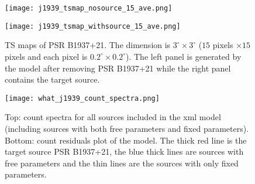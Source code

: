 \documentclass[a4paper, 12pt]{report}
\newcommand{\add}[1]{
  $<$\colorbox{red}{\textbf{add}}$>$#1$<$\colorbox{red}{\textbf{/add}}$>$
}
\begin{document}
        \begin{figure}[!htp]
          \centering
          \begin{minipage}{0.40\textwidth}
            \begin{center} 
              \texttt{[image: j1939\_tsmap\_nosource\_15\_ave.png]}
            \end{center}
          \end{minipage}
          \begin{minipage}{0.40\textwidth}
            \begin{center}
              \texttt{[image: j1939\_tsmap\_withsource\_15\_ave.png]}
            \end{center}
          \end{minipage}
          \caption[TS maps of PSR B1937+21.]
            {TS maps of PSR B1937+21. The dimension is $3^{\circ} \times 3^{\circ}$
            ($15$ pixels $\times 15$ pixels and each pixel is 
            $0.2^{\circ} \times 0.2^{\circ}$). The left panel is generated by the model 
            after removing PSR B1937+21 while the right panel contains the target source.}
          \label{fig: j1939_tsmap_comparison_15_ave}
        \end{figure}
  

        \begin{figure}[!htp]
          \centering 
          \texttt{[image: what\_j1939\_count\_spectra.png]}
          \caption[The count spectra and count residuals of the fitted spectral model.]
            {Top: count spectra for all sources included in the xml model (including 
            sources with both free parameters and fixed parameters). Bottom: count residuals plot
            of the model. The thick red line is the target source PSR B1937+21, the blue thick 
            lines are sources with free parameters and the thin lines are the sources with only 
            fixed parameters.}
          \label{fig: j1939_count_spectra_ave}
        \end{figure}
            

\end{document}
